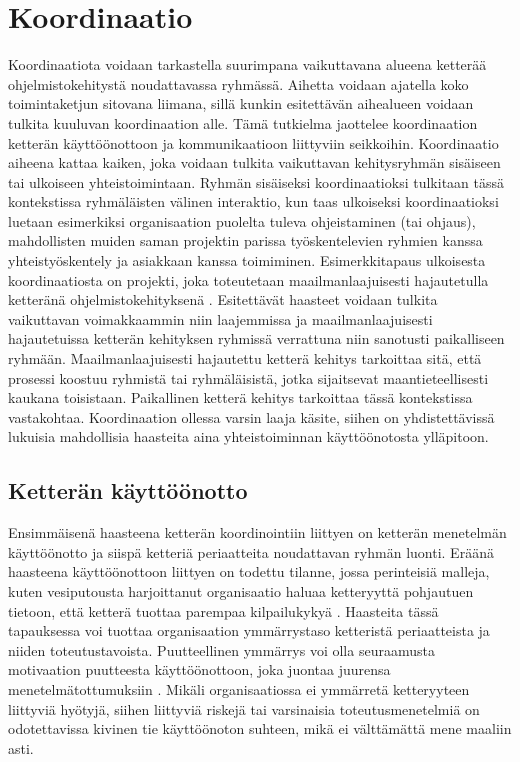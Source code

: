 \chapter{Koordinaatio}

Koordinaatiota voidaan tarkastella suurimpana vaikuttavana alueena ketterää ohjelmistokehitystä noudattavassa ryhmässä. Aihetta voidaan ajatella koko toimintaketjun sitovana liimana, sillä kunkin esitettävän aihealueen voidaan tulkita kuuluvan koordinaation alle. Tämä tutkielma jaottelee koordinaation ketterän käyttöönottoon ja kommunikaatioon liittyviin seikkoihin. Koordinaatio aiheena kattaa kaiken, joka voidaan tulkita vaikuttavan kehitysryhmän sisäiseen tai ulkoiseen yhteistoimintaan. Ryhmän sisäiseksi koordinaatioksi tulkitaan tässä kontekstissa ryhmäläisten välinen interaktio, kun taas ulkoiseksi koordinaatioksi luetaan esimerkiksi organisaation puolelta tuleva ohjeistaminen (tai ohjaus), mahdollisten muiden saman projektin parissa työskentelevien ryhmien kanssa yhteistyöskentely ja asiakkaan kanssa toimiminen. Esimerkkitapaus ulkoisesta koordinaatiosta on projekti, joka toteutetaan maailmanlaajuisesti hajautetulla ketteränä ohjelmistokehityksenä \cite{ALZOUBI201622}. Esitettävät haasteet voidaan tulkita vaikuttavan voimakkaammin niin laajemmissa ja maailmanlaajuisesti hajautetuissa ketterän kehityksen ryhmissä verrattuna niin sanotusti paikalliseen ryhmään. Maailmanlaajuisesti hajautettu ketterä kehitys tarkoittaa sitä, että prosessi koostuu ryhmistä tai ryhmäläisistä, jotka sijaitsevat maantieteellisesti kaukana toisistaan. Paikallinen ketterä kehitys tarkoittaa tässä kontekstissa vastakohtaa. Koordinaation ollessa varsin laaja käsite, siihen on yhdistettävissä lukuisia mahdollisia haasteita aina yhteistoiminnan käyttöönotosta ylläpitoon.

\section{Ketterän käyttöönotto}

Ensimmäisenä haasteena ketterän koordinointiin liittyen on ketterän menetelmän käyttöönotto ja siispä ketteriä periaatteita noudattavan ryhmän luonti. Eräänä haasteena käyttöönottoon liittyen on todettu tilanne, jossa perinteisiä malleja, kuten vesiputousta harjoittanut organisaatio haluaa ketteryyttä pohjautuen tietoon, että ketterä tuottaa parempaa kilpailukykyä \cite{MCKNIGHT2014168}. Haasteita tässä tapauksessa voi tuottaa organisaation ymmärrystaso ketteristä periaatteista ja niiden toteutustavoista. Puutteellinen ymmärrys voi olla seuraamusta motivaation puutteesta käyttöönottoon, joka juontaa juurensa menetelmätottumuksiin \cite{GREGORY201692}. Mikäli organisaatiossa ei ymmärretä ketteryyteen liittyviä hyötyjä, siihen liittyviä riskejä tai varsinaisia toteutusmenetelmiä on odotettavissa kivinen tie käyttöönoton suhteen, mikä ei välttämättä mene maaliin asti.

